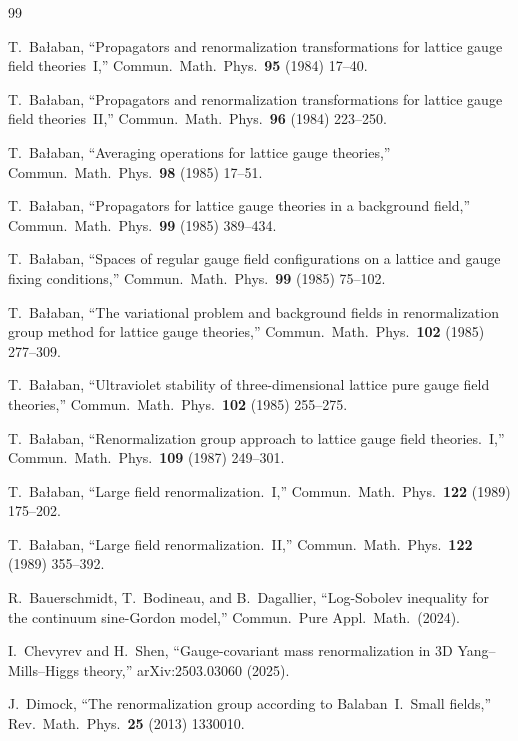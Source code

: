 \documentclass[11pt,a4paper]{article}
\theoremstyle{plain}
\theoremstyle{definition}
\theoremstyle{remark}
\begin{document}
\begin{thebibliography}{99}

 T.~Ba{\l}aban, ``Propagators and
  renormalization transformations for lattice gauge
  field theories~I,''
  Commun.\ Math.\ Phys.\ \textbf{95} (1984) 17--40.

 T.~Ba{\l}aban, ``Propagators and
  renormalization transformations for lattice gauge
  field theories~II,''
  Commun.\ Math.\ Phys.\ \textbf{96} (1984) 223--250.

 T.~Ba{\l}aban, ``Averaging operations
  for lattice gauge theories,''
  Commun.\ Math.\ Phys.\ \textbf{98} (1985) 17--51.

 T.~Ba{\l}aban, ``Propagators for
  lattice gauge theories in a background field,''
  Commun.\ Math.\ Phys.\ \textbf{99} (1985) 389--434.

 T.~Ba{\l}aban, ``Spaces of regular
  gauge field configurations on a lattice and gauge
  fixing conditions,''
  Commun.\ Math.\ Phys.\ \textbf{99} (1985) 75--102.

 T.~Ba{\l}aban, ``The variational problem
  and background fields in renormalization group method
  for lattice gauge theories,''
  Commun.\ Math.\ Phys.\ \textbf{102} (1985) 277--309.

 T.~Ba{\l}aban, ``Ultraviolet stability
  of three-dimensional lattice pure gauge field theories,''
  Commun.\ Math.\ Phys.\ \textbf{102} (1985) 255--275.

 T.~Ba{\l}aban, ``Renormalization group
  approach to lattice gauge field theories.~I,''
  Commun.\ Math.\ Phys.\ \textbf{109} (1987) 249--301.

 T.~Ba{\l}aban, ``Large field
  renormalization.~I,''
  Commun.\ Math.\ Phys.\ \textbf{122} (1989) 175--202.

 T.~Ba{\l}aban, ``Large field
  renormalization.~II,''
  Commun.\ Math.\ Phys.\ \textbf{122} (1989) 355--392.

 R.~Bauerschmidt, T.~Bodineau, and
  B.~Dagallier, ``Log-Sobolev inequality for the
  continuum sine-Gordon model,''
  Commun.\ Pure Appl.\ Math.\ (2024).

 I.~Chevyrev and H.~Shen, ``Gauge-covariant
  mass renormalization in 3D Yang--Mills--Higgs theory,''
  arXiv:2503.03060 (2025).

 J.~Dimock, ``The renormalization group
  according to Balaban~I.~Small fields,''
  Rev.\ Math.\ Phys.\ \textbf{25} (2013) 1330010.


\end{thebibliography}
\end{document}
